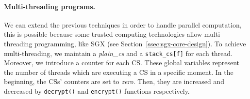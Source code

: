 \paragraph{Multi-threading programs.}
We can extend the previous techniques in order to handle parallel computation, 
this is possible because some trusted computing technologies allow 
multi-threading programming, like SGX (see Section~\ref{ssec:sgx-core-design}).
To achieve multi-threading, we maintain a \emph{plain\_cs} and a 
\texttt{stack\_cs[f]} for each thread.
Moreover, we introduce a counter for each CS. %
These global variables represent the number of threads which are executing a CS 
in a specific moment.
In the beginning, the CSs' counters are set to \emph{zero}.
Then, they are increased and decreased by \texttt{decrypt()} and 
\texttt{encrypt()} functions respectively.


%
%


